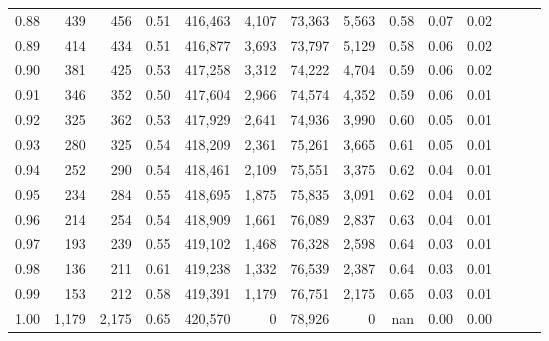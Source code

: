 \begin{tabular}{rrrrrrrrrrrrrr}
0.88 &     439 &    456 &  0.51 &  416,463 &    4,107 &  73,363 &   5,563 &  0.58 &  0.07 &      0.02 \\
0.89 &     414 &    434 &  0.51 &  416,877 &    3,693 &  73,797 &   5,129 &  0.58 &  0.06 &      0.02 \\
0.90 &     381 &    425 &  0.53 &  417,258 &    3,312 &  74,222 &   4,704 &  0.59 &  0.06 &      0.02 \\
0.91 &     346 &    352 &  0.50 &  417,604 &    2,966 &  74,574 &   4,352 &  0.59 &  0.06 &      0.01 \\
0.92 &     325 &    362 &  0.53 &  417,929 &    2,641 &  74,936 &   3,990 &  0.60 &  0.05 &      0.01 \\
0.93 &     280 &    325 &  0.54 &  418,209 &    2,361 &  75,261 &   3,665 &  0.61 &  0.05 &      0.01 \\
0.94 &     252 &    290 &  0.54 &  418,461 &    2,109 &  75,551 &   3,375 &  0.62 &  0.04 &      0.01 \\
0.95 &     234 &    284 &  0.55 &  418,695 &    1,875 &  75,835 &   3,091 &  0.62 &  0.04 &      0.01 \\
0.96 &     214 &    254 &  0.54 &  418,909 &    1,661 &  76,089 &   2,837 &  0.63 &  0.04 &      0.01 \\
0.97 &     193 &    239 &  0.55 &  419,102 &    1,468 &  76,328 &   2,598 &  0.64 &  0.03 &      0.01 \\
0.98 &     136 &    211 &  0.61 &  419,238 &    1,332 &  76,539 &   2,387 &  0.64 &  0.03 &      0.01 \\
0.99 &     153 &    212 &  0.58 &  419,391 &    1,179 &  76,751 &   2,175 &  0.65 &  0.03 &      0.01 \\
1.00 &   1,179 &  2,175 &  0.65 &  420,570 &        0 &  78,926 &       0 &   nan &  0.00 &      0.00 \\
\bottomrule
\end{tabular}
